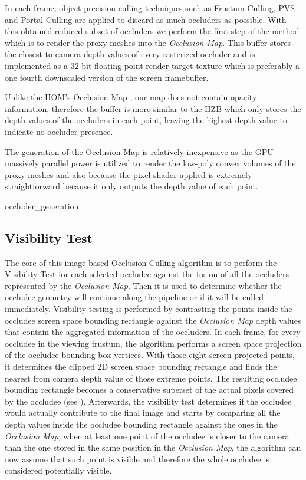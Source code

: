 \documentclass[10pt, conference]{IEEEtran}
\begin{document}
In each frame, object-precision culling techniques such as Frustum Culling, PVS and Portal Culling \cite{survey_visibility} are applied 
to discard as much occluders as possible. 
With this obtained reduced subset of occluders we perform the first step of the method which is to render the proxy meshes into the \emph{Occlusion Map}. 
This buffer stores the closest to camera depth values of every rasterized occluder and is implemented as a 32-bit floating point render target texture 
which is preferably a one fourth downscaled version of the screen framebuffer. \

Unlike the HOM's Occlusion Map \cite{hom}, our map does not contain opacity information, therefore the buffer is more similar 
to the HZB \cite{Hierarchical_zbuffer} which only stores the depth values of the occluders in 
each point, leaving the highest depth value to indicate no occluder presence.\

The generation of the Occlusion Map is relatively inexpensive as the GPU massively parallel power is utilized to render the low-poly convex volumes of 
the proxy meshes and also because the pixel shader applied is extremely straightforward because it only outputs the depth value of each point.

{occluder_generation}{
%
}


\subsection{Visibility Test}
%
The core of this image based Occlusion Culling algorithm is to perform the Visibility Test for each selected occludee against the fusion of all the occluders represented by the \emph{Occlusion Map}. 
Then it is used to determine whether the occludee geometry will continue along the pipeline or if it will be culled immediately.
Visibility testing is performed by contrasting the points inside the occludee screen space bounding rectangle against the \emph{Occlusion Map} depth values that contain the aggregated information of the occluders.  
In each frame, for every occludee in the viewing frustum, the algorithm performs a screen space projection of the occludee bounding box vertices. 
With those eight screen projected points, it determines the clipped 2D screen space bounding rectangle and finds the nearest from camera depth value of those extreme points. 
The resulting occludee bounding rectangle becomes a conservative superset of the actual pixels covered by the occludee  (see ). 
Afterwards, the visibility test determines if the occludee would actually contribute to the final image and starts by comparing all 
the depth values inside the occludee bounding rectangle against the ones in the \emph{Occlusion Map}; when at least one point of the occludee is closer to the camera than the one stored in the same position in the \emph{Occlusion Map}, the algorithm can now assume that such point is visible and therefore the whole occludee is considered potentially visible.
\end{document}
